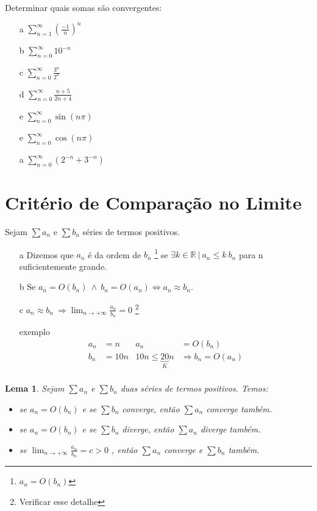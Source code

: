 \documentclass[12pt,openany]{book}
\newtheorem{lemma}{Lema}[section]
\begin{document}
Determinar quais somas são convergentes:
\begin{itemize}
\item [a] $\displaystyle{\sum_{n = 1}^{\infty} \left(\frac{-1}{n}\right)^n}$
\item [b] $\displaystyle{\sum_{n = 0}^{\infty} 10^{-n} }$
\item [c] $\displaystyle{\sum_{n = 0}^{\infty} \frac{3^n}{2^n}}$
\item [d] $\displaystyle{\sum_{n = 0}^{\infty} \frac{n+5}{2n+4}}$
\item [e] $\displaystyle{\sum_{n = 0}^{\infty} \sin (n\pi)}$
\item [e] $\displaystyle{\sum_{n = 0}^{\infty} \cos (n\pi)}$
\item [a] $\displaystyle{\sum_{n = 0}^{\infty}  (2^{-n} + 3^{-n})}$
\end{itemize}

\section{Critério de Comparação no Limite}
\label{sec:s29}
Sejam $\sum a_n$ e $\sum b_n$ séries de termos positivos.
\begin{itemize}
\item [a] Dizemos que $a_n$ é da ordem de $b_n$ \footnote{$a_n = O(b_n)$} se $\exists k \in \mathds{R}\ |\ a_n \leq k\ b_n$ para n suficientemente grande.
\item [b]  Se $a_n = O(b_n) \ \land \ b_n = O(a_n) \Longleftrightarrow a_n\approx b_n$.
\item [c] $\displaystyle{a_n\approx b_n \ \Rightarrow \lim_{n \rightarrow +\infty} \frac{a_n}{b_n} = 0}$ \footnote{Verificar esse detalhe}
\item [exemplo] 
\begin{align*}
a_n &= n    &    a_n &= O(b_n) \\
b_n &= 10n  &   10n \leq \underbrace{20}_K n &\Rightarrow b_n = O(a_n) \\
\end{align*}
\end{itemize}

\begin{lemma}
Sejam $\sum a_n$ e $\sum b_n$ duas séries de termos positivos. Temos:\begin{itemize}
\item se $a_n = O(b_n)$ e se $\sum b_n$ converge, então $\sum a_n$ converge também.
\item se $a_n = O(b_n)$ e se $\sum b_n$ diverge, então $\sum a_n$ diverge também.
\item se $\displaystyle{\lim_{n \rightarrow +\infty} \frac{a_n}{b_n} = c > 0}$ , então $\sum a_n$ converge e $\sum b_n$ também.
\end{itemize}
\end{lemma}
\end{document}
